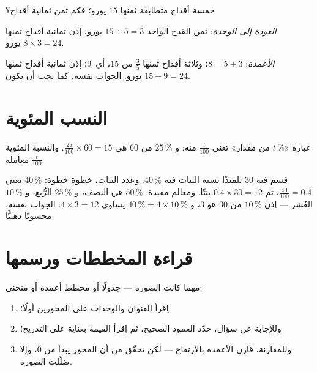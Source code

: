 \begin{example}\label{ex:g6:propdata:methods}
خمسة أقداح متطابقة ثمنها $15$ يورو؛ فكم ثمن ثمانية أقداح؟

\emph{العودة إلى الوحدة}: ثمن القدح الواحد $15 \div 5 = 3$ يورو، إذن ثمانية
أقداح ثمنها $8 \times 3 = 24$ يورو.

\emph{الأعمدة}: $8 = 5 + 3$؛ وثلاثة أقداح ثمنها $\frac{3}{5}$ من $15$،
أي\ $9$؛ إذن ثمانية أقداح ثمنها $15 + 9 = 24$ يورو. الجواب نفسه، كما
يجب أن يكون.
\end{example}

\section{النسب المئوية}

\begin{definition}\label{def:g6:propdata:percent}
عبارة «$t\,\%$ من مقدار» تعني  $\frac{t}{100}$ منه:
و $25\,\%$ من $60$ هي $\frac{25}{100} \times 60 = 15$. والنسبة المئوية
 معامله $\frac{t}{100}$.
\end{definition}

\begin{example}\label{ex:g6:propdata:percent}
قسم فيه $30$ تلميذًا نسبة البنات فيه $40\,\%$. وعدد البنات، خطوة
خطوة: $40\,\%$ تعني $\frac{40}{100} = 0.4$، ثم
$0.4 \times 30 = 12$ بنتًا. ومعالم مفيدة:
$50\,\%$ هي النصف، و $25\,\%$ الرُّبع، و $10\,\%$ العُشر ---
إذن $10\,\%$ من $30$ هو $3$، و $40\,\% = 4 \times 10\,\%$ يساوي
$4 \times 3 = 12$: الجواب نفسه، محسوبًا ذهنيًّا.
\end{example}

\section{قراءة المخططات ورسمها}

\begin{method}\label{met:g6:propdata:read}
مهما كانت الصورة --- جدولًا أو مخطط أعمدة أو منحنى:
\begin{enumerate}
  \item اِقرأ العنوان والوحدات على المحورين أولًا؛
  \item وللإجابة عن سؤال، حدّد العمود الصحيح، ثم اِقرأ
        القيمة بعناية على التدريج؛
  \item وللمقارنة، قارن الأعمدة بالارتفاع --- لكن تحقّق من أن المحور
        يبدأ من $0$، وإلا ضلّلت الصورة.
\end{enumerate}
\end{method}

